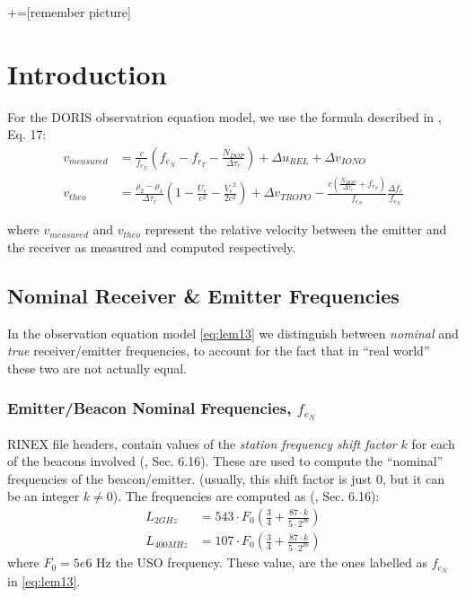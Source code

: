 +=[remember picture]
\everymath{\displaystyle}

\section{Introduction}
\label{sec:doris-introduction}

For the DORIS observatrion equation model, we use the formula described in 
\cite{lemoine-2016}, Eq. 17:
\begin{subequations} \label{eq:lem13}
    \begin{align}
        v_{measured} & = \frac{c}{f_{e_N}} (f_{e_N} - f_{r_T} -
          \frac{N_{DOP}}{\Delta\tau_r}) + \Delta u_{REL} + 
          \Delta v_{IONO} \label{eq:lem13a} \\
        v_{theo} &= \frac{\rho_2 - \rho_1}{\Delta\tau_r} 
          (1- \frac{U_e}{c^2} - \frac{{V_e}^2}{2 c^2}) + 
          \Delta v_{TROPO} - \frac{c(\frac{N_{DOP}}{\Delta\tau_r} + 
          f_{r_T})}{f_{e_N}} \frac{\Delta f_e}{f_{e_N}} \label{eq:lem13b}
    \end{align}
\end{subequations}

where $v_{measured}$ and $v_{theo}$ represent the relative velocity between  
the emitter and the receiver as measured and computed respectively.

\subsection{Nominal Receiver \& Emitter Frequencies}
\label{ssec:nominal-frequencies}
In the observation equation model \ref{eq:lem13} we distinguish between 
\emph{nominal} and \emph{true} receiver/emitter frequencies, to account for 
the fact that in ``real world'' these two are not actually equal.

\subsubsection{Emitter/Beacon Nominal Frequencies, $f_{e_N}$}
\label{sssec:beacon-nominal-frequencies}

RINEX file headers, contain values of the \emph{station frequency shift 
factor} $k$ for each of the beacons involved (\cite{DORISRNX3}, Sec. 6.16). 
These are used to compute the ``nominal'' frequencies of the beacon/emitter. 
(usually, this shift factor is just $0$, but it can be an integer 
$k \neq 0$). The frequencies are computed as (\cite{DORISRNX3}, Sec. 6.16):
\begin{equation}
  \begin{aligned}
    L_{2GHz}   &= 543 \cdot F_0 \left( \frac{3}{4} + \frac{87\cdot k}{5 \cdot 2^{26}} \right) \\
    L_{400MHz} &= 107 \cdot F_0 \left( \frac{3}{4} + \frac{87\cdot k}{5 \cdot 2^{26}} \right) 
    \label{eq:nominal-freq}
  \end{aligned}
\end{equation}
where $F_0 = 5e6 \text{ Hz}$ the USO frequency. These value, are the ones 
labelled as $f_{e_N}$ in \ref{eq:lem13}.

